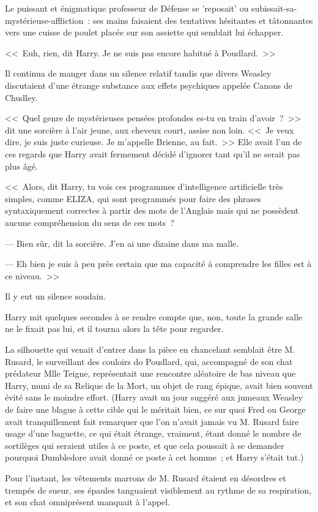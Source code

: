 Le puissant et énigmatique professeur de Défense se 'reposait' ou subissait-sa-mystérieuse-affliction~: ses mains faisaient des tentatives hésitantes et tâtonnantes vers une cuisse de poulet placée sur son assiette qui semblait lui échapper.

<<~Euh, rien, dit Harry. Je ne suis pas encore habitué à Poudlard.~>>

Il continua de manger dans un silence relatif tandis que divers Weasley discutaient d'une étrange substance aux effets psychiques appelée Canons de Chudley.

<<~Quel genre de mystérieuses pensées profondes es-tu en train d'avoir~?~>> dit une sorcière à l'air jeune, aux cheveux court, assise non loin. <<~Je veux dire, je suis juste curieuse. Je m'appelle Brienne, au fait.~>> Elle avait l'un de ces regards que Harry avait fermement décidé d'ignorer tant qu'il ne serait pas plus âgé.

<<~Alors, dit Harry, tu vois ces programmes d'intelligence artificielle très simples, comme ELIZA, qui sont programmés pour faire des phrases syntaxiquement correctes à partir des mots de l'Anglais mais qui ne possèdent aucune compréhension du sens de ces mots~?

--- Bien sûr, dit la sorcière. J'en ai une dizaine dans ma malle.

--- Eh bien je suis à peu près certain que ma capacité à comprendre les filles est à ce niveau.~>>

Il y eut un silence soudain.

Harry mit quelques secondes à se rendre compte que, non, toute la grande salle ne le fixait pas lui, et il tourna alors la tête pour regarder.

La silhouette qui venait d'entrer dans la pièce en chancelant semblait être M. Rusard, le surveillant des couloirs do Poudlard, qui, accompagné de son chat prédateur Mlle Teigne, représentait une rencontre aléatoire de bas niveau que Harry, muni de sa Relique de la Mort, un objet de rang épique, avait bien souvent évité sans le moindre effort. (Harry avait un jour suggéré aux jumeaux Weasley de faire une blague à cette cible qui le méritait bien, ce sur quoi Fred ou George avait tranquillement fait remarquer que l'on n'avait jamais vu M. Rusard faire usage d'une baguette, ce qui était étrange, vraiment, étant donné le nombre de sortilèges qui seraient utiles à ce poste, et que cela poussait à se demander pourquoi Dumbledore avait donné ce poste à cet homme~; et Harry s'était tut.)

Pour l'instant, les vêtements marrons de M. Rusard étaient en désordres et trempés de sueur, ses épaules tanguaient visiblement au rythme de sa respiration, et son chat omniprésent manquait à l'appel.

